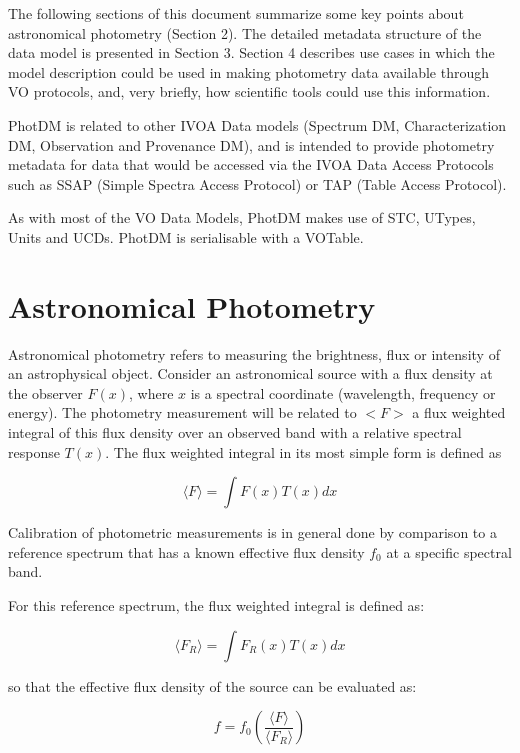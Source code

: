 \documentclass[11pt,a4paper]{ivoa}
\begin{document}
The following sections of this document summarize some key points
about astronomical photometry (Section 2). The detailed metadata
structure of the data model is presented in Section 3. Section 4
describes use cases in which the model description could be used in
making photometry data available through VO protocols, and, very briefly,
how scientific tools could use this information.


PhotDM is related to other IVOA Data models (Spectrum DM, Characterization DM,
Observation and Provenance DM),  and is intended to provide photometry
metadata for data that would be accessed via the IVOA Data Access Protocols
such as SSAP (Simple Spectra Access Protocol) or TAP (Table Access Protocol).

As with most of the VO Data Models, PhotDM makes use of STC, UTypes, Units
and UCDs. PhotDM is serialisable with a VOTable.

\section{Astronomical Photometry}
Astronomical photometry refers to measuring the brightness, flux or
intensity of an astrophysical object. Consider an astronomical source
with a flux density at the observer $F(x)$, where $x$ is a spectral coordinate
(wavelength, frequency or energy).  The photometry measurement will be related
to $<F>$ a flux weighted integral of this flux density over an observed band
with a relative spectral response $T(x)$. The flux weighted integral in its most
simple form is defined as


\begin{equation} \label{eq:1}
\langle F\rangle = \int F(x)T(x)dx
\end{equation}

Calibration of photometric measurements is in general done by comparison to a
reference spectrum that has a known effective flux density $f_0$ at a specific
spectral band.


For this reference spectrum, the flux weighted integral is defined as:

\begin{equation} \label{eq:2}
\langle F_R \rangle= \int F_R (x)T(x)dx
\end{equation}


so that the effective flux density of the source can be evaluated as:

\begin{equation} \label{eq:3}
f = f_0 ( \frac{\langle F\rangle }{\langle F_R \rangle } )
\end{equation}
\end{document}

